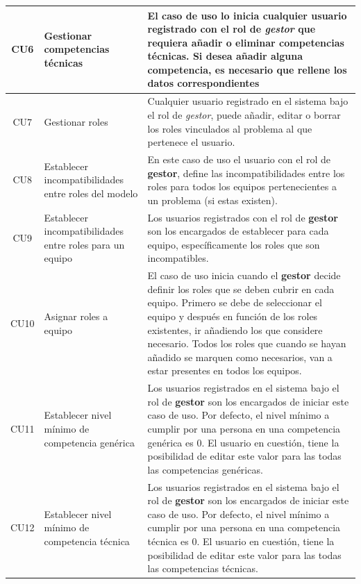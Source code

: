 \begin{longtable}{| c | p{3cm} | p{9cm} |}
	CU6&Gestionar competencias técnicas & El caso de uso lo inicia cualquier usuario registrado con el rol de \textit{gestor} que requiera añadir o eliminar competencias técnicas. Si desea añadir alguna competencia, es necesario que rellene los datos correspondientes\\ \hline
	
	CU7&Gestionar roles & Cualquier usuario registrado en el sistema bajo el rol de \textit{gestor}, puede añadir, editar o borrar los roles vinculados al problema al que pertenece el usuario.\\ \hline
	
	CU8&Establecer incompatibilidades entre roles del modelo & En este caso de uso el usuario con el rol de \textbf{gestor}, define las incompatibilidades entre los roles para todos los equipos pertenecientes a un problema (si estas existen). \\ \hline
	
	CU9&Establecer incompatibilidades entre roles para un equipo & Los usuarios registrados con el rol de \textbf{gestor} son los encargados de establecer para cada equipo, específicamente los roles que son incompatibles.\\ \hline
	
	CU10&Asignar roles a equipo & El caso de uso inicia cuando el \textbf{gestor} decide definir los roles que se deben cubrir en cada equipo. Primero se debe de seleccionar el equipo y después en función de los roles existentes, ir añadiendo los que considere necesario. Todos los roles que cuando se hayan añadido se marquen como necesarios, van a estar presentes en todos los equipos.\\ \hline
	
	CU11&Establecer nivel mínimo de competencia genérica & Los usuarios registrados en el sistema bajo el rol de \textbf{gestor} son los encargados de iniciar este caso de uso. Por defecto, el nivel mínimo a cumplir por una persona en una competencia genérica es 0. El usuario en cuestión, tiene la posibilidad de editar este valor para las todas las competencias genéricas.\\ \hline
	
	CU12&Establecer nivel mínimo de competencia técnica & Los usuarios registrados en el sistema bajo el rol de \textbf{gestor} son los encargados de iniciar este caso de uso. Por defecto, el nivel mínimo a cumplir por una persona en una competencia técnica es 0. El usuario en cuestión, tiene la posibilidad de editar este valor para las todas las competencias técnicas.\\ \hline
	

\end{longtable}
